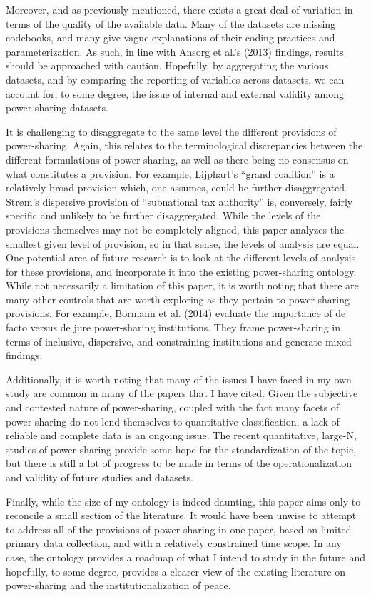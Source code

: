 \documentclass[12pt]{article}
\begin{document}
Moreover, and as previously mentioned, there exists a great deal of variation in terms of the quality of the available data. Many of the datasets are missing codebooks, and many give vague explanations of their coding practices and parameterization. As such, in line with Ansorg et al.’s (2013) findings, results should be approached with caution. Hopefully, by aggregating the various datasets, and by comparing the reporting of variables across datasets, we can account for, to some degree, the issue of internal and external validity among power-sharing datasets.

It is challenging to disaggregate to the same level the different provisions of power-sharing. Again, this relates to the terminological discrepancies between the different formulations of power-sharing, as well as there being no consensus on what constitutes a provision. For example, Lijphart’s “grand coalition” is a relatively broad provision which, one assumes, could be further disaggregated. Strøm’s dispersive provision of “subnational tax authority” is, conversely, fairly specific and unlikely to be further disaggregated. While the levels of the provisions themselves may not be completely aligned, this paper analyzes the smallest given level of provision, so in that sense, the levels of analysis are equal. One potential area of future research is to look at the different levels of analysis for these provisions, and incorporate it into the existing power-sharing ontology. While not necessarily a limitation of this paper, it is worth noting that there are many other controls that are worth exploring as they pertain to power-sharing provisions. For example, Bormann et al. (2014) evaluate the importance of de facto versus de jure power-sharing institutions. They frame power-sharing in terms of inclusive, dispersive, and constraining institutions and generate mixed findings. 

Additionally, it is worth noting that many of the issues I have faced in my own study are common in many of the papers that I have cited. Given the subjective and contested nature of power-sharing, coupled with the fact many facets of power-sharing do not lend themselves to quantitative classification, a lack of reliable and complete data is an ongoing issue. The recent quantitative, large-N, studies of power-sharing provide some hope for the standardization of the topic, but there is still a lot of progress to be made in terms of the operationalization and validity of future studies and datasets.  

Finally, while the size of my ontology is indeed daunting, this paper aims only to reconcile a small section of the literature. It would have been unwise to attempt to address all of the provisions of power-sharing in one paper, based on limited primary data collection, and with a relatively constrained time scope. In any case, the ontology provides a roadmap of what I intend to study in the future and hopefully, to some degree, provides a clearer view of the existing literature on power-sharing and the institutionalization of peace.  
\end{document}
